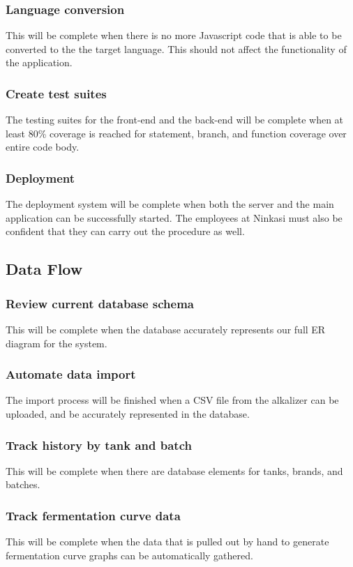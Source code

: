         \subsubsection{Language conversion}
            This will be complete when there is no more Javascript code that is able to be converted to the the target language. This should not affect the functionality of the application.
        \subsubsection{Create test suites}
            The testing suites for the front-end and the back-end will be complete when at least 80\% coverage is reached for statement, branch, and function coverage over entire code body.
        \subsubsection{Deployment}
            The deployment system will be complete when both the server and the main application can be successfully started. The employees at Ninkasi must also be confident that they can carry out the procedure as well.
    \subsection{Data Flow}
        \subsubsection{Review current database schema}
            This will be complete when the database accurately represents our full ER diagram for the system.
        \subsubsection{Automate data import}
            The import process will be finished when a CSV file from the alkalizer can be uploaded, and be accurately represented in the database.
        \subsubsection{Track history by tank and batch}
            This will be complete when there are database elements for tanks, brands, and batches.
        \subsubsection{Track fermentation curve data}
            This will be complete when the data that is pulled out by hand to generate fermentation curve graphs can be automatically gathered.
